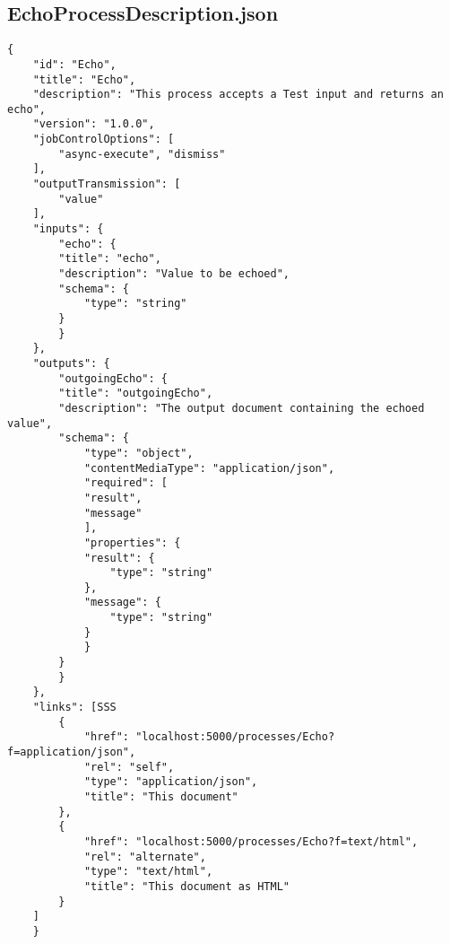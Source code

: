 \subsection{EchoProcessDescription.json}
\begin{lstlisting}[caption={EchoProcessDescription.json}, style = JSON]
{
    "id": "Echo",
    "title": "Echo",
    "description": "This process accepts a Test input and returns an echo",
    "version": "1.0.0",
    "jobControlOptions": [
        "async-execute", "dismiss"
    ],
    "outputTransmission": [
        "value"
    ],
    "inputs": {
        "echo": {
        "title": "echo",
        "description": "Value to be echoed",
        "schema": {
            "type": "string"
        }
        }
    },
    "outputs": {
        "outgoingEcho": {
        "title": "outgoingEcho",
        "description": "The output document containing the echoed value",
        "schema": {
            "type": "object",
            "contentMediaType": "application/json",
            "required": [
            "result",
            "message"
            ],
            "properties": {
            "result": {
                "type": "string"
            },
            "message": {
                "type": "string"
            }
            }
        }
        }
    },
    "links": [SSS
        {
            "href": "localhost:5000/processes/Echo?f=application/json",
            "rel": "self",
            "type": "application/json",
            "title": "This document"
        },
        {
            "href": "localhost:5000/processes/Echo?f=text/html",
            "rel": "alternate",
            "type": "text/html",
            "title": "This document as HTML"
        }
    ]
    }     
\end{lstlisting}\label{RessourceEchoProcessDescriptionJSON}  